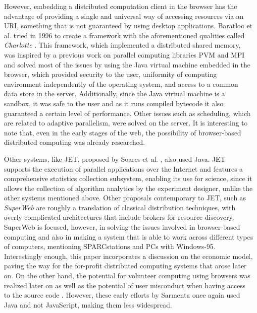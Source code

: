 \documentclass[journal,onecolumn]{IEEEtran}
\begin{document}
However, embedding a
distributed computation client in the browser has the advantage of
providing a single and universal way of accessing resources via an
URI, something that is not guaranteed by using desktop applications. 
Baratloo et al. tried in 1996 to create a framework with
the aforementioned qualities called {\em Charlotte}
\cite{baratloo1999charlotte}. This framework, which implemented a
distributed shared memory, was inspired by a previous work
on parallel computing libraries PVM and MPI and solved most of the issues by
using the Java virtual machine embedded in the browser,
which provided
security to the user, uniformity of computing environment
independently of the operating system, and access to a common data store in the
server. Additionally, since the Java virtual machine is a sandbox, it was safe to the user
and as it runs compiled bytecode it also guaranteed a certain level of
performance. %
Other issues such as scheduling, which are related to adaptive 
parallelism, were solved on the server. It is interesting to note that,
even in the early stages of the web, the possibility of
browser-based distributed computing was already researched. 


Other systems, like JET, proposed by Soares et
al. \cite{soares1998get}, also used Java. JET supports
the execution of parallel applications over the Internet and features
a comprehensive statistics collection subsystem, enabling its use for science, %
since it allows %
the collection of algorithm analytics by the
experiment designer, unlike the other systems mentioned
above. Other proposals contemporary to JET, such as {\em SuperWeb}
\cite{alexandrov1997superweb} are roughly a translation of classical
distribution techniques, with overly complicated architectures that include
brokers for resource discovery. SuperWeb is focused,
however, in solving the
issues involved in browser-based computing and also in making a system
that is able to work across different types of computers, mentioning
SPARCstations and PCs with Windows-95. Interestingly enough, this
paper incorporates a discussion on the economic model, paving the way
for the for-profit distributed computing systems that arose later on. 
On the other hand, the potential for volunteer computing using
browsers was realized
later on \cite{sarmenta-bayanihan} as well as the potential of
user misconduct when having access to the source code \cite{sarmenta-sabotagetolerance}. 
However, these early efforts by
Sarmenta once again used Java and not JavaScript, making them %
less widespread.
\end{document}
